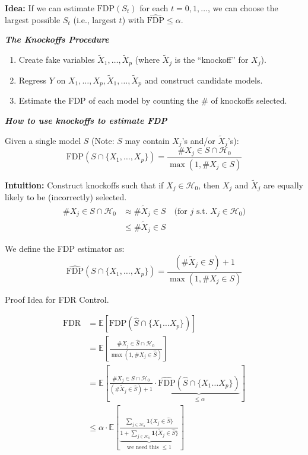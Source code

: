 \noindent \textbf{Idea:} If we can estimate $\text{FDP}(S_t)$ for each $t=0,1,\dots$, we can choose the largest possible $S_t$ (i.e., largest $t$) with $\widehat{\text{FDP}} \le \alpha$.

\emph{\textbf{The Knockoffs Procedure}}

\begin{enumerate}
    \item Create fake variables $\tilde{X}_1, \dots, \tilde{X}_p$ (where $\tilde{X}_j$ is the ``knockoff'' for $X_j$).
    \item Regress $Y$ on $X_1, \dots, X_p, \tilde{X}_1, \dots, \tilde{X}_p$ and construct candidate models.
    \item Estimate the FDP of each model by counting the \# of knockoffs selected.
\end{enumerate}
\emph{\textbf{How to use knockoffs to estimate FDP}}

Given a single model $S$ (Note: $S$ may contain $X_j$'s and/or $\tilde{X}_j$'s):
\[ \text{FDP}(S \cap \{X_1, \dots, X_p\}) = \frac{\# X_j \in S \cap \mathcal{H}_0}{\max(1, \# X_j \in S)} \]

\noindent \textbf{Intuition:} Construct knockoffs such that if $X_j \in \mathcal{H}_0$, then $X_j$ and $\tilde{X}_j$ are equally likely to be (incorrectly) selected. 
\begin{align*}
    \# X_j \in S \cap \mathcal{H}_0 &\approx \# \tilde{X}_j \in S \quad \text{(for } j \text{ s.t. } X_j \in \mathcal{H}_0) \\
    &\le \# \tilde{X}_j \in S
\end{align*}

\noindent We define the FDP estimator as:
\[ \widehat{\text{FDP}}(S \cap \{X_1, \dots, X_p\}) = \frac{(\# \tilde{X}_j \in S) + 1}{\max(1, \# X_j \in S)} \]

Proof Idea for FDR Control.

\begin{align*}
    \text{FDR} &= \mathbb{E}[\text{FDP}(\hat{S} \cap \{X_1 \dots X_p\})] \\
    &= \mathbb{E} \left[ \frac{\# X_j \in \hat{S} \cap \mathcal{H}_0}{\max(1, \# X_j \in \hat{S})} \right] \\
    &= \mathbb{E} \left[ \frac{\# X_j \in \hat{S} \cap \mathcal{H}_0}{(\# \tilde{X}_j \in \hat{S}) + 1} \cdot \underbrace{\widehat{\text{FDP}}(\hat{S} \cap \{X_1 \dots X_p\})}_{\le \alpha} \right] \\
    &\le \alpha \cdot \mathbb{E} \left[ \underbrace{\frac{\sum_{j \in \mathcal{H}_0} \mathbf{1}\{X_j \in \hat{S}\}}{1 + \sum_{j \in \mathcal{H}_0} \mathbf{1}\{\tilde{X}_j \in \hat{S}\}}}_{\text{we need this } \le 1} \right]
\end{align*}

